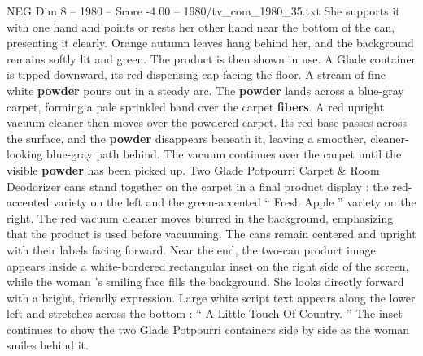 \begin{textsample}{NEG Dim 8 – 1980 – Score -4.00 – 1980/tv\_com\_1980\_35.txt}
She supports it with one hand and points or rests her other hand near the bottom of the can, presenting it clearly.
Orange autumn leaves hang behind her, and the background remains softly lit and green.
The product is then shown in use.
A Glade container is tipped downward, its red dispensing cap facing the floor.
A stream of fine white \textbf{powder} pours out in a steady arc.
The \textbf{powder} lands across a blue-gray carpet, forming a pale sprinkled band over the carpet \textbf{fibers}.
A red upright vacuum cleaner then moves over the powdered carpet.
Its red base passes across the surface, and the \textbf{powder} disappears beneath it, leaving a smoother, cleaner-looking blue-gray path behind.
The vacuum continues over the carpet until the visible \textbf{powder} has been picked up.
Two Glade Potpourri Carpet \& Room Deodorizer cans stand together on the carpet in a final product display : the red-accented variety on the left and the green-accented “ Fresh Apple ” variety on the right.
The red vacuum cleaner moves blurred in the background, emphasizing that the product is used before vacuuming.
The cans remain centered and upright with their labels facing forward.
Near the end, the two-can product image appears inside a white-bordered rectangular inset on the right side of the screen, while the woman ’s smiling face fills the background.
She looks directly forward with a bright, friendly expression.
Large white script text appears along the lower left and stretches across the bottom : “ A Little Touch Of Country. ” The inset continues to show the two Glade Potpourri containers side by side as the woman smiles behind it.

\end{textsample}
